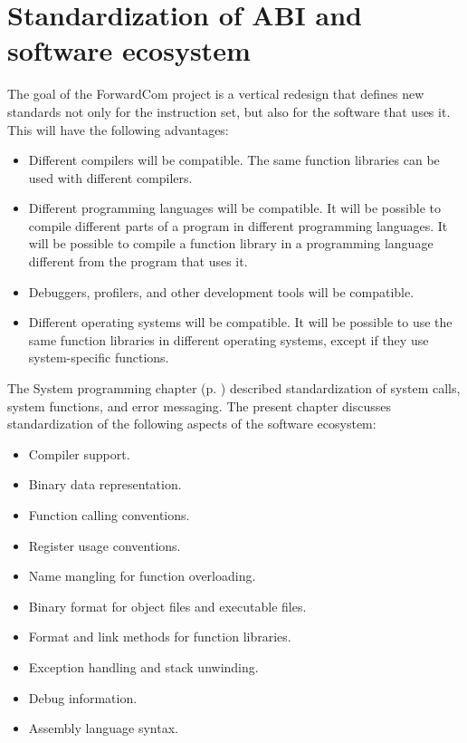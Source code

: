 \documentclass[forwardcom.tex]{subfiles}
\begin{document}
\RaggedRight

\chapter{Standardization of ABI and software ecosystem} \label{StandardizationOfAbi}
The goal of the ForwardCom project is a vertical redesign that defines new standards not only for the instruction set, but also for the software that uses it. This will have the following advantages:

\begin{itemize}
\item Different compilers will be compatible. The same function libraries can be used with different compilers. 

\item Different programming languages will be compatible. It will be possible to compile different parts of a program in different programming languages. It will be possible to compile a function library in a programming language different from the program that uses it. 

\item Debuggers, profilers, and other development tools will be compatible. 

\item Different operating systems will be compatible. It will be possible to use the same function libraries in different operating systems, except if they use system-specific functions. 
\end{itemize}

The System programming chapter (p. \pageref{SystemProgramming}) described standardization of system calls, system functions, and error messaging. The present chapter discusses standardization of the following aspects of the software ecosystem:

\begin{itemize}
\item Compiler support. 

\item Binary data representation. 

\item Function calling conventions. 

\item Register usage conventions.

\item Name mangling for function overloading.

\item Binary format for object files and executable files.

\item Format and link methods for function libraries.

\item Exception handling and stack unwinding.

\item Debug information.

\item Assembly language syntax. 

\end{itemize}
\end{document}
